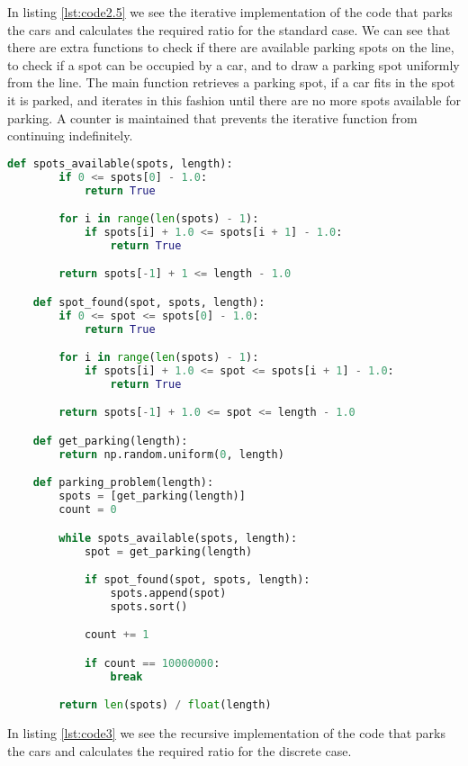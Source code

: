 In listing \ref{lst:code2.5} we see the iterative implementation of the code 
that parks the cars and calculates the required ratio for the standard case. 
We can see that there are extra functions to check if there are available parking 
spots on the line, to check if a spot can be occupied by a car, and to draw 
a parking spot uniformly from the line. The main function retrieves a parking 
spot, if a car fits in the spot it is parked, and iterates in this fashion 
until there are no more spots available for parking. A counter is maintained 
that prevents the iterative function from continuing indefinitely. \bigskip

\begin{lstlisting}[language=python,caption=Parking Problem - Iterative - standard case,label=lst:code2.5]
	def spots_available(spots, length):
		if 0 <= spots[0] - 1.0:
			return True

		for i in range(len(spots) - 1):
			if spots[i] + 1.0 <= spots[i + 1] - 1.0:
				return True

		return spots[-1] + 1 <= length - 1.0

	def spot_found(spot, spots, length):
		if 0 <= spot <= spots[0] - 1.0:
			return True

		for i in range(len(spots) - 1):
			if spots[i] + 1.0 <= spot <= spots[i + 1] - 1.0:
				return True

		return spots[-1] + 1.0 <= spot <= length - 1.0

	def get_parking(length):
		return np.random.uniform(0, length)

	def parking_problem(length):
		spots = [get_parking(length)]
		count = 0

		while spots_available(spots, length):
			spot = get_parking(length)

			if spot_found(spot, spots, length):
				spots.append(spot)
				spots.sort()

			count += 1

			if count == 10000000:
				break

		return len(spots) / float(length)

\end{lstlisting}  \bigskip

In listing \ref{lst:code3} we see the recursive implementation of the code 
that parks the cars and calculates the required ratio for the discrete case. \bigskip

